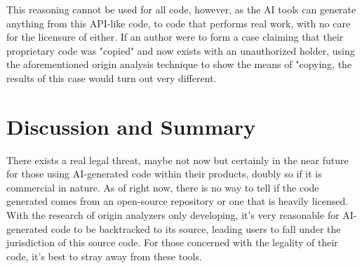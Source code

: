\documentclass[journal]{IEEEtran}
\begin{document}
This reasoning cannot be used for all code, however,
as the AI tools can generate anything from this API-like code, to code that performs
real work, with no care for the licensure of either. If an author were to form a case
claiming that their proprietary code was "copied" and now exists with an unauthorized
holder, using the aforementioned origin analysis technique to show the means of "copying,
the results of this case would turn out very different.


\section{Discussion and Summary}



There exists a real legal threat, maybe not now but certainly in the near future
for those using AI-generated code within their products, doubly so if it is commercial
in nature. As of right now, there is no way to tell if the code generated comes
from an open-source repository or one that is heavily licensed. With the research
of origin analyzers only developing, it's very reasonable for AI-generated code
to be backtracked to its source, leading users to fall under the jurisdiction of
this source code. For those concerned with the legality of their code, it's
best to stray away from these tools. 
\end{document}
